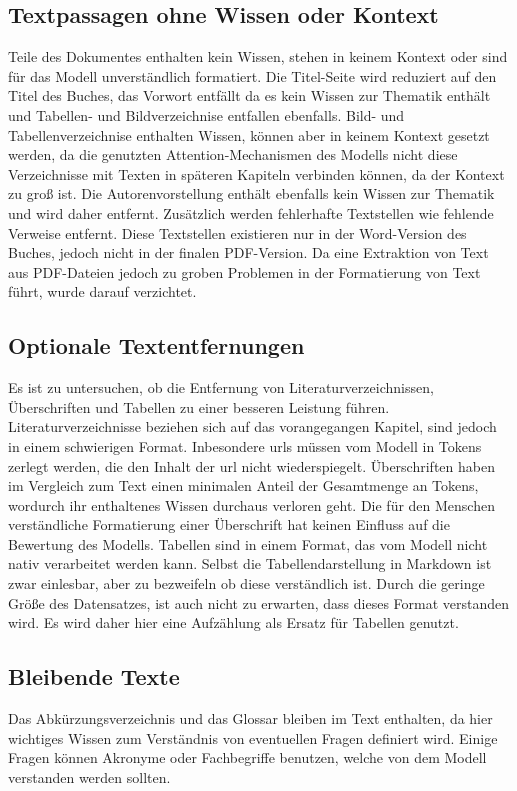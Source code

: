 \subsection{Textpassagen ohne Wissen oder Kontext}
Teile des Dokumentes enthalten kein Wissen, stehen in keinem Kontext oder sind für das Modell unverständlich formatiert.
Die Titel-Seite wird reduziert auf den Titel des Buches, das Vorwort entfällt da es kein Wissen zur Thematik enthält und Tabellen- und Bildverzeichnise entfallen ebenfalls.
Bild- und Tabellenverzeichnise enthalten Wissen, können aber in keinem Kontext gesetzt werden, da die genutzten Attention-Mechanismen des Modells nicht diese Verzeichnisse mit Texten in späteren Kapiteln verbinden können, da der Kontext zu groß ist.
Die Autorenvorstellung enthält ebenfalls kein Wissen zur Thematik und wird daher entfernt.
Zusätzlich werden fehlerhafte Textstellen wie fehlende Verweise entfernt.
Diese Textstellen existieren nur in der Word-Version des Buches, jedoch nicht in der finalen PDF-Version.
Da eine Extraktion von Text aus PDF-Dateien jedoch zu groben Problemen in der Formatierung von Text führt, wurde darauf verzichtet.

\subsection{Optionale Textentfernungen}
Es ist zu untersuchen, ob die Entfernung von Literaturverzeichnissen, Überschriften und Tabellen zu einer besseren Leistung führen.
Literaturverzeichnisse beziehen sich auf das vorangegangen Kapitel, sind jedoch in einem schwierigen Format.
Inbesondere \ac{url}s müssen vom Modell in Tokens zerlegt werden, die den Inhalt der \ac{url} nicht wiederspiegelt. 
Überschriften haben im Vergleich zum Text einen minimalen Anteil der Gesamtmenge an Tokens, wordurch ihr enthaltenes Wissen durchaus verloren geht.
Die für den Menschen verständliche Formatierung einer Überschrift hat keinen Einfluss auf die Bewertung des Modells.
Tabellen sind in einem Format, das vom Modell nicht nativ verarbeitet werden kann.
Selbst die Tabellendarstellung in Markdown ist zwar einlesbar, aber zu bezweifeln ob diese verständlich ist.
Durch die geringe Größe des Datensatzes, ist auch nicht zu erwarten, dass dieses Format verstanden wird.
Es wird daher hier eine Aufzählung als Ersatz für Tabellen genutzt.

\subsection{Bleibende Texte}
Das Abkürzungsverzeichnis und das Glossar bleiben im Text enthalten, da hier wichtiges Wissen zum Verständnis von eventuellen Fragen definiert wird.
Einige Fragen können Akronyme oder Fachbegriffe benutzen, welche von dem Modell verstanden werden sollten.

